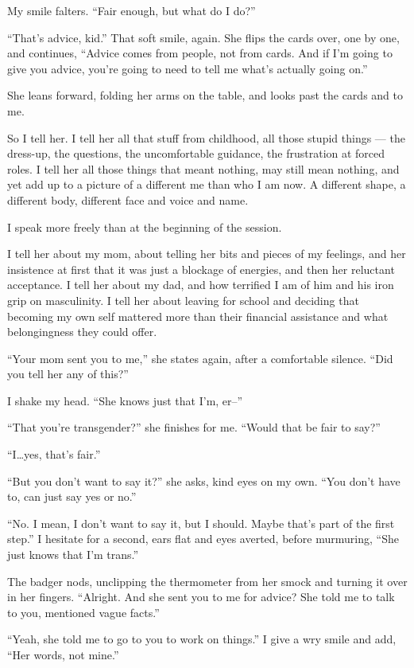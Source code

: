 My smile falters. ``Fair enough, but what do I do?''

``That's advice, kid.'' That soft smile, again. She flips the cards
over, one by one, and continues, ``Advice comes from people, not from
cards. And if I'm going to give you advice, you're going to need to tell
me what's actually going on.''

She leans forward, folding her arms on the table, and looks past the
cards and to me.

So I tell her. I tell her all that stuff from childhood, all those
stupid things --- the dress-up, the questions, the uncomfortable
guidance, the frustration at forced roles. I tell her all those things
that meant nothing, may still mean nothing, and yet add up to a picture
of a different me than who I am now. A different shape, a different
body, different face and voice and name.

I speak more freely than at the beginning of the session.

I tell her about my mom, about telling her bits and pieces of my
feelings, and her insistence at first that it was just a blockage of
energies, and then her reluctant acceptance. I tell her about my dad,
and how terrified I am of him and his iron grip on masculinity. I tell
her about leaving for school and deciding that becoming my own self
mattered more than their financial assistance and what belongingness
they could offer.

``Your mom sent you to me,'' she states again, after a comfortable
silence. ``Did you tell her any of this?''

I shake my head. ``She knows just that I'm, er--''

``That you're transgender?'' she finishes for me. ``Would that be fair
to say?''

``I\ldots{}yes, that's fair.''

``But you don't want to say it?'' she asks, kind eyes on my own. ``You
don't have to, can just say yes or no.''

``No. I mean, I don't want to say it, but I should. Maybe that's part of
the first step.'' I hesitate for a second, ears flat and eyes averted,
before murmuring, ``She just knows that I'm trans.''

The badger nods, unclipping the thermometer from her smock and turning
it over in her fingers. ``Alright. And she sent you to me for advice?
She told me to talk to you, mentioned vague facts.''

``Yeah, she told me to go to you to work on things.'' I give a wry smile
and add, ``Her words, not mine.''

